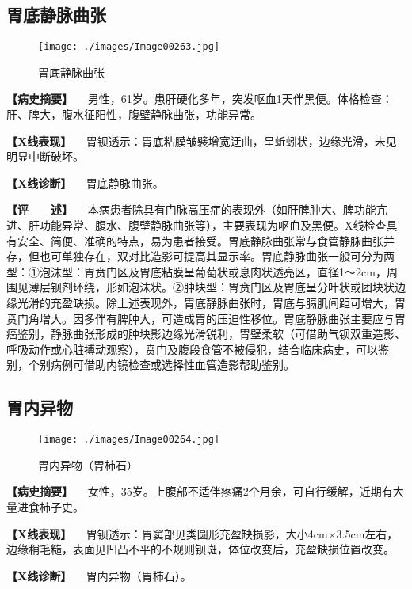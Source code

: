 \subsection{胃底静脉曲张}

\begin{figure}[!htbp]
 \centering
 \texttt{[image: ./images/Image00263.jpg]}
 \captionsetup{justification=centering}
 \caption{胃底静脉曲张}
 \label{fig5-3-2}
  \end{figure} 

\textbf{【病史摘要】}
　男性，61岁。患肝硬化多年，突发呕血1天伴黑便。体格检查：肝、脾大，腹水征阳性，腹壁静脉曲张，功能异常。

\textbf{【X线表现】}
　胃钡透示：胃底粘膜皱襞增宽迂曲，呈蚯蚓状，边缘光滑，未见明显中断破坏。

\textbf{【X线诊断】} 　胃底静脉曲张。

\textbf{【评　　述】}
　本病患者除具有门脉高压症的表现外（如肝脾肿大、脾功能亢进、肝功能异常、腹水、腹壁静脉曲张等），主要表现为呕血及黑便。X线检查具有安全、简便、准确的特点，易为患者接受。胃底静脉曲张常与食管静脉曲张并存，但也可单独存在，双对比造影可提高其显示率。胃底静脉曲张一般可分为两型：①泡沫型：胃贲门区及胃底粘膜呈葡萄状或息肉状透亮区，直径1～2cm，周围见薄层钡剂环绕，形如泡沫状。②肿块型：胃贲门区及胃底呈分叶状或团块状边缘光滑的充盈缺损。除上述表现外，胃底静脉曲张时，胃底与膈肌间距可增大，胃贲门角增大。因多伴有脾肿大，可造成胃的压迫性移位。胃底静脉曲张主要应与胃癌鉴别，静脉曲张形成的肿块影边缘光滑锐利，胃壁柔软（可借助气钡双重造影、呼吸动作或心脏搏动观察），贲门及腹段食管不被侵犯，结合临床病史，可以鉴别，个别病例可借助内镜检查或选择性血管造影帮助鉴别。

\subsection{胃内异物}

\begin{figure}[!htbp]
 \centering
 \texttt{[image: ./images/Image00264.jpg]}
 \captionsetup{justification=centering}
 \caption{胃内异物（胃柿石）}
 \label{fig5-3-3}
  \end{figure} 

\textbf{【病史摘要】}
　女性，35岁。上腹部不适伴疼痛2个月余，可自行缓解，近期有大量进食柿子史。

\textbf{【X线表现】}
　胃钡透示：胃窦部见类圆形充盈缺损影，大小4cm×3.5cm左右，边缘稍毛糙，表面见凹凸不平的不规则钡斑，体位改变后，充盈缺损位置改变。

\textbf{【X线诊断】} 　胃内异物（胃柿石）。

